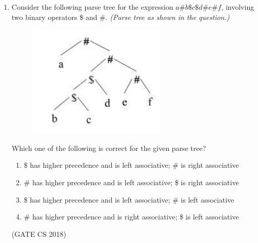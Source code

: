 \documentclass[12pt]{article}
\begin{document}
\begin{enumerate}
\begin{align}
T_1 &: \ a?(b|c)^*a\\
T_2 &: \ b?(a|c)^*b\\
T_3 &: \ c?(b|a)^*c
\end{align}

Note that “$x?$” means $0$ or $1$ occurrence of the symbol $x$. Note also that the analyzer outputs the token that matches the longest possible prefix.

If the string \texttt{bbaaacabc} is processed by the analyzer, which one of the following is the sequence of tokens it outputs?
\begin{multicols}{4}
\begin{enumerate}
\item $T_1T_2T_3$
\item $T_1T_1T_3$
\item $T_2T_1T_3$
\item $T_3T_3$
\end{enumerate}
\end{multicols}
(GATE CS 2018)

\item Consider the following parse tree for the expression $a \# b \$ c \$ d \# e \# f$, involving two binary operators \$ and \#.
\emph{(Parse tree as shown in the question.)}

\begin{figure}[H]
    \centering
    \includegraphics[width=0.5\columnwidth]{figs/ass6_a_q38.png}
    \caption{}
    \label{fig:placeholder}
\end{figure}

Which one of the following is correct for the given parse tree?
\begin{enumerate}
\item \$ has higher precedence and is left associative; \# is right associative
\item \# has higher precedence and is left associative; \$ is right associative
\item \$ has higher precedence and is left associative; \# is left associative
\item \# has higher precedence and is right associative; \$ is left associative
\end{enumerate}
(GATE CS 2018)


\end{enumerate}
\end{document}
